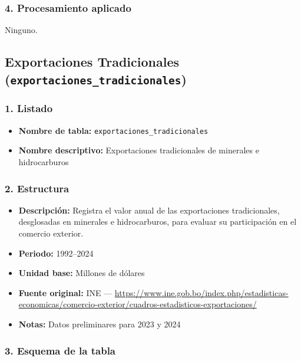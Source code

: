 \documentclass[12pt,a4paper]{article}
\begin{document}
\subsubsection*{4. Procesamiento aplicado}
Ninguno.


\newpage
\subsection{Exportaciones Tradicionales (\texttt{exportaciones\_tradicionales})}

\subsubsection*{1. Listado}
\begin{itemize}
  \item \textbf{Nombre de tabla:} \texttt{exportaciones\_tradicionales}
  \item \textbf{Nombre descriptivo:} Exportaciones tradicionales de minerales e hidrocarburos
\end{itemize}

\subsubsection*{2. Estructura}
\begin{itemize}
  \item \textbf{Descripción:} Registra el valor anual de las exportaciones tradicionales, desglosadas en minerales e hidrocarburos, para evaluar su participación en el comercio exterior.
  \item \textbf{Periodo:} 1992--2024
  \item \textbf{Unidad base:} Millones de dólares
  \item \textbf{Fuente original:} INE — \url{https://www.ine.gob.bo/index.php/estadisticas-economicas/comercio-exterior/cuadros-estadisticos-exportaciones/}
  \item \textbf{Notas:} Datos preliminares para 2023 y 2024
\end{itemize}

\subsubsection*{3. Esquema de la tabla}
\end{document}
